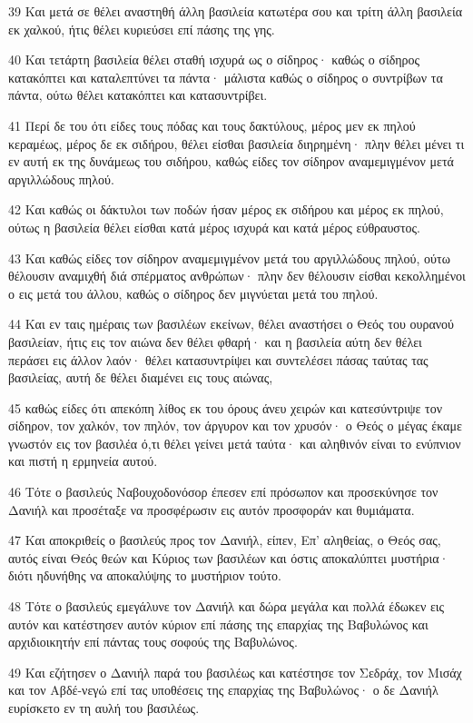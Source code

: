 \par 39 Και μετά σε θέλει αναστηθή άλλη βασιλεία κατωτέρα σου και τρίτη άλλη βασιλεία εκ χαλκού, ήτις θέλει κυριεύσει επί πάσης της γης.
\par 40 Και τετάρτη βασιλεία θέλει σταθή ισχυρά ως ο σίδηρος· καθώς ο σίδηρος κατακόπτει και καταλεπτύνει τα πάντα· μάλιστα καθώς ο σίδηρος ο συντρίβων τα πάντα, ούτω θέλει κατακόπτει και κατασυντρίβει.
\par 41 Περί δε του ότι είδες τους πόδας και τους δακτύλους, μέρος μεν εκ πηλού κεραμέως, μέρος δε εκ σιδήρου, θέλει είσθαι βασιλεία διηρημένη· πλην θέλει μένει τι εν αυτή εκ της δυνάμεως του σιδήρου, καθώς είδες τον σίδηρον αναμεμιγμένον μετά αργιλλώδους πηλού.
\par 42 Και καθώς οι δάκτυλοι των ποδών ήσαν μέρος εκ σιδήρου και μέρος εκ πηλού, ούτως η βασιλεία θέλει είσθαι κατά μέρος ισχυρά και κατά μέρος εύθραυστος.
\par 43 Και καθώς είδες τον σίδηρον αναμεμιγμένον μετά του αργιλλώδους πηλού, ούτω θέλουσιν αναμιχθή διά σπέρματος ανθρώπων· πλην δεν θέλουσιν είσθαι κεκολλημένοι ο εις μετά του άλλου, καθώς ο σίδηρος δεν μιγνύεται μετά του πηλού.
\par 44 Και εν ταις ημέραις των βασιλέων εκείνων, θέλει αναστήσει ο Θεός του ουρανού βασιλείαν, ήτις εις τον αιώνα δεν θέλει φθαρή· και η βασιλεία αύτη δεν θέλει περάσει εις άλλον λαόν· θέλει κατασυντρίψει και συντελέσει πάσας ταύτας τας βασιλείας, αυτή δε θέλει διαμένει εις τους αιώνας,
\par 45 καθώς είδες ότι απεκόπη λίθος εκ του όρους άνευ χειρών και κατεσύντριψε τον σίδηρον, τον χαλκόν, τον πηλόν, τον άργυρον και τον χρυσόν· ο Θεός ο μέγας έκαμε γνωστόν εις τον βασιλέα ό,τι θέλει γείνει μετά ταύτα· και αληθινόν είναι το ενύπνιον και πιστή η ερμηνεία αυτού.
\par 46 Τότε ο βασιλεύς Ναβουχοδονόσορ έπεσεν επί πρόσωπον και προσεκύνησε τον Δανιήλ και προσέταξε να προσφέρωσιν εις αυτόν προσφοράν και θυμιάματα.
\par 47 Και αποκριθείς ο βασιλεύς προς τον Δανιήλ, είπεν, Επ' αληθείας, ο Θεός σας, αυτός είναι Θεός θεών και Κύριος των βασιλέων και όστις αποκαλύπτει μυστήρια· διότι ηδυνήθης να αποκαλύψης το μυστήριον τούτο.
\par 48 Τότε ο βασιλεύς εμεγάλυνε τον Δανιήλ και δώρα μεγάλα και πολλά έδωκεν εις αυτόν και κατέστησεν αυτόν κύριον επί πάσης της επαρχίας της Βαβυλώνος και αρχιδιοικητήν επί πάντας τους σοφούς της Βαβυλώνος.
\par 49 Και εζήτησεν ο Δανιήλ παρά του βασιλέως και κατέστησε τον Σεδράχ, τον Μισάχ και τον Αβδέ-νεγώ επί τας υποθέσεις της επαρχίας της Βαβυλώνος· ο δε Δανιήλ ευρίσκετο εν τη αυλή του βασιλέως.

